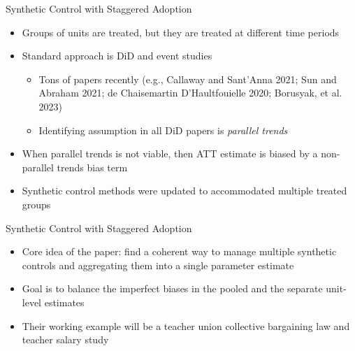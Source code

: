 \documentclass{beamer}
\begin{document}
\begin{frame}{Synthetic Control with Staggered Adoption}

\begin{itemize}
\item Groups of units are treated, but they are treated at different time periods
\item Standard approach is DiD and event studies
	\begin{itemize}
	\item Tons of papers recently (e.g., Callaway and Sant'Anna 2021; Sun and Abraham 2021; de Chaisemartin D'Haultfouielle 2020; Borusyak, et al. 2023)
	\item Identifying assumption in all DiD papers is \emph{parallel trends}
	\end{itemize}
\item When parallel trends is not viable, then ATT estimate is biased by a non-parallel trends bias term
\item Synthetic control methods were updated to accommodated multiple treated groups

\end{itemize}

\end{frame}



\begin{frame}{Synthetic Control with Staggered Adoption}

\begin{itemize}
\item Core idea of the paper:  find a coherent way to manage multiple synthetic controls and aggregating them into a single parameter estimate
\item Goal is to balance the imperfect biases in the pooled and the separate unit-level estimates
\item Their working example will be a teacher union collective bargaining law and teacher salary study
\end{itemize}

\end{frame}
\end{document}

